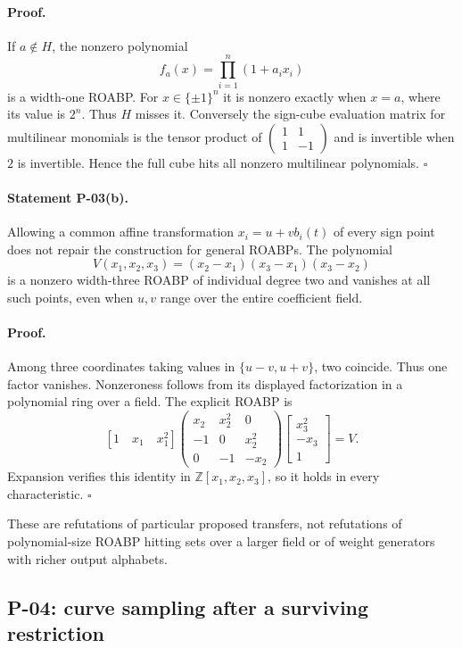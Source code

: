 \paragraph{Proof.}
If $a\notin H$, the nonzero polynomial
\[
 f_a(x)=\prod_{i=1}^n(1+a_ix_i)
\]
is a width-one ROABP. For $x\in\{\pm1\}^n$ it is nonzero exactly when $x=a$, where its value is $2^n$. Thus $H$ misses it. Conversely the sign-cube evaluation matrix for multilinear monomials is the tensor product of $\begin{pmatrix}1&1\\1&-1\end{pmatrix}$ and is invertible when $2$ is invertible. Hence the full cube hits all nonzero multilinear polynomials. $\square$

\paragraph{Statement P-03(b).}
Allowing a common affine transformation $x_i=u+vb_i(t)$ of every sign point does not repair the construction for general ROABPs. The polynomial
\[
 V(x_1,x_2,x_3)=(x_2-x_1)(x_3-x_1)(x_3-x_2)
\]
is a nonzero width-three ROABP of individual degree two and vanishes at all such points, even when $u,v$ range over the entire coefficient field.
\paragraph{Proof.}
Among three coordinates taking values in $\{u-v,u+v\}$, two coincide. Thus one factor vanishes. Nonzeroness follows from its displayed factorization in a polynomial ring over a field. The explicit ROABP is
\[
 [1\quad x_1\quad x_1^2]
 \begin{pmatrix}
 x_2&x_2^2&0\\-1&0&x_2^2\\0&-1&-x_2
 \end{pmatrix}
 \begin{bmatrix}x_3^2\\-x_3\\1\end{bmatrix}=V.
\]
Expansion verifies this identity in $\mathbb Z[x_1,x_2,x_3]$, so it holds in every characteristic. $\square$

These are refutations of particular proposed transfers, not refutations of polynomial-size ROABP hitting sets over a larger field or of weight generators with richer output alphabets.

\subsection{P-04: curve sampling after a surviving restriction}
